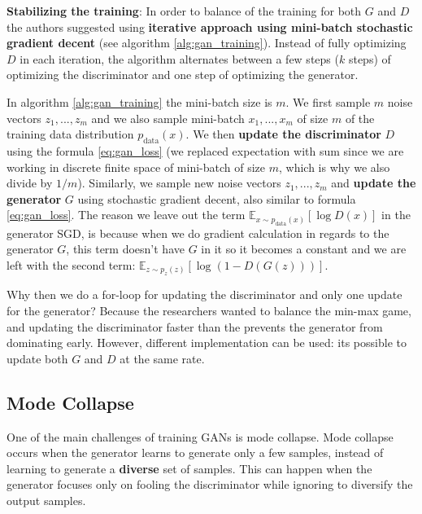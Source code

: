 \textbf{Stabilizing the training}: In order to balance of the training for both $G$ and $D$ the authors suggested using \textbf{iterative approach using mini-batch stochastic gradient decent} (see algorithm \ref{alg:gan_training}). Instead of fully optimizing $D$ in each iteration, the algorithm alternates between a few steps ($k$ steps) of optimizing the discriminator and one step of optimizing the generator.

In algorithm \ref{alg:gan_training} the mini-batch size is $m$. We first sample $m$ noise vectors $z_1, ..., z_m$ and we also sample mini-batch $x_1, ..., x_m$ of size $m$ of the training data distribution $p_\text{data} (x)$. We then \textbf{update the discriminator} $D$ using the formula \ref{eq:gan_loss} (we replaced expectation with sum since we are working in discrete finite space of mini-batch of size $m$, which is why we also divide by $1/m$). Similarly, we sample new noise vectors $z_1, ..., z_m$ and \textbf{update the generator} $G$ using stochastic gradient decent, also similar to formula \ref{eq:gan_loss}. The reason we leave out the term $\mathbb{E}_{x \sim p_{\text{data}}(x)}[\log D(x)]$ in the generator SGD, is because when we do gradient calculation in regards to the generator $G$, this term doesn't have $G$ in it so it becomes a constant and we are left with the second term: $\mathbb{E}_{z \sim p_z(z)}[\log(1 - D(G(z)))]$.

Why then we do a for-loop for updating the discriminator and only one update for the generator? Because the researchers wanted to balance the min-max game, and updating the discriminator faster than the prevents the generator from dominating early. However, different implementation can be used: its possible to update both $G$ and $D$ at the same rate.








\subsection{Mode Collapse}
\label{gan_mode_collapse}

One of the main challenges of training GANs is mode collapse. Mode collapse occurs when the generator learns to generate only a few samples, instead of learning to generate a \textbf{diverse} set of samples. This can happen when the generator focuses only on fooling the discriminator while ignoring to diversify the output samples.


